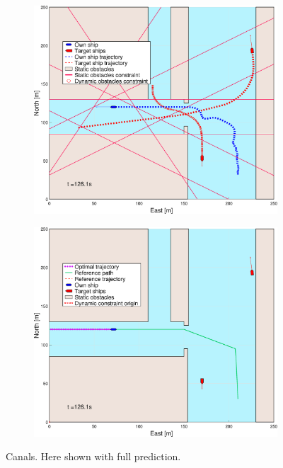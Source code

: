 \begin{figure}[ht]
\begin{subfigure}[b]{0.494\textwidth}
        \subcaption{}
    \end{subfigure}
    \hfill
    \\ 
    \begin{subfigure}[b]{0.494\textwidth}
        \centering
        \includegraphics[width=\textwidth]{Images/Figures/Havn1/_Simple_0fig1_time=126}
        \subcaption{}
    \end{subfigure}
    \hfill
    \begin{subfigure}[b]{0.494\textwidth}
        \centering
        \includegraphics[width=\textwidth]{Images/Figures/Havn1/_Simple_0fig999_time=126}
        \subcaption{}
    \end{subfigure}
    \hfill
    \caption{Canals. Here shown with full prediction.}
\end{figure}
